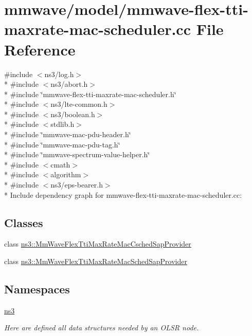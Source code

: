 \hypertarget{mmwave-flex-tti-maxrate-mac-scheduler_8cc}{}\section{mmwave/model/mmwave-\/flex-\/tti-\/maxrate-\/mac-\/scheduler.cc File Reference}
\label{mmwave-flex-tti-maxrate-mac-scheduler_8cc}
{\ttfamily \#include $<$ns3/log.\+h$>$}\\*
{\ttfamily \#include $<$ns3/abort.\+h$>$}\\*
{\ttfamily \#include \char`\"{}mmwave-\/flex-\/tti-\/maxrate-\/mac-\/scheduler.\+h\char`\"{}}\\*
{\ttfamily \#include $<$ns3/lte-\/common.\+h$>$}\\*
{\ttfamily \#include $<$ns3/boolean.\+h$>$}\\*
{\ttfamily \#include $<$stdlib.\+h$>$}\\*
{\ttfamily \#include \char`\"{}mmwave-\/mac-\/pdu-\/header.\+h\char`\"{}}\\*
{\ttfamily \#include \char`\"{}mmwave-\/mac-\/pdu-\/tag.\+h\char`\"{}}\\*
{\ttfamily \#include \char`\"{}mmwave-\/spectrum-\/value-\/helper.\+h\char`\"{}}\\*
{\ttfamily \#include $<$cmath$>$}\\*
{\ttfamily \#include $<$algorithm$>$}\\*
{\ttfamily \#include $<$ns3/eps-\/bearer.\+h$>$}\\*
Include dependency graph for mmwave-\/flex-\/tti-\/maxrate-\/mac-\/scheduler.cc\+:
\subsection*{Classes}
\begin{DoxyCompactItemize}
\item 
class \hyperlink{classns3_1_1MmWaveFlexTtiMaxRateMacCschedSapProvider}{ns3\+::\+Mm\+Wave\+Flex\+Tti\+Max\+Rate\+Mac\+Csched\+Sap\+Provider}
\item 
class \hyperlink{classns3_1_1MmWaveFlexTtiMaxRateMacSchedSapProvider}{ns3\+::\+Mm\+Wave\+Flex\+Tti\+Max\+Rate\+Mac\+Sched\+Sap\+Provider}
\end{DoxyCompactItemize}
\subsection*{Namespaces}
\begin{DoxyCompactItemize}
\item 
 \hyperlink{namespacens3}{ns3}
\begin{DoxyCompactList}\small\item\em Here are defined all data structures needed by an O\+L\+SR node. \end{DoxyCompactList}\end{DoxyCompactItemize}

